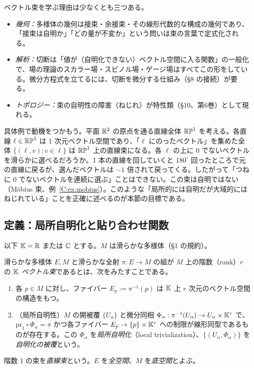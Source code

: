 ベクトル束を学ぶ理由は少なくとも三つある。
\begin{itemize}
\item \emph{幾何：}多様体の幾何は接束・余接束・その線形代数的な構成の幾何であり、「接束は自明か」「どの量が不変か」という問いは束の言葉で定式化される。
\item \emph{解析：}切断は「値が（自明化できない）ベクトル空間に入る関数」の一般化で、場の理論のスカラー場・スピノル場・ゲージ場はすべてこの形をしている。微分方程式を立てるには、切断を微分する仕組み（§8 の接続）が要る。
\item \emph{トポロジー：}束の自明性の障害（ねじれ）が特性類（§10、第6巻）として現れる。
\end{itemize}
具体例で動機をつかもう。平面 $\mathbb R^2$ の原点を通る直線全体 $\mathbb{RP}^1$ を考える。各直線 $\ell\in\mathbb{RP}^1$ は 1 次元ベクトル空間であり、「$\ell$ にのったベクトル」を集めた全体 $\{(\ell,v):v\in\ell\}$ は $\mathbb{RP}^1$ 上の直線束になる。各 $\ell$ の上に 0 でないベクトルを滑らかに選べるだろうか。1 本の直線を回していくと $180^\circ$ 回ったところで元の直線に戻るが、選んだベクトルは $-1$ 倍されて戻ってくる。したがって「つねに 0 でないベクトルを連続に選ぶ」ことはできない。この束は自明ではない（Möbius 束、例~\ref{C:ex:mobius}）。このような「局所的には自明だが大域的にはねじれている」ことを正確に述べるのが本節の目標である。

\subsection{定義：局所自明化と貼り合わせ関数}
以下 $\mathbb K=\mathbb R$ または $\mathbb C$ とする。$M$ は滑らかな多様体（§1 の規約）。

\begin{defn}[ベクトル束]\label{C:def:vb}
滑らかな多様体 $E,M$ と滑らかな全射 $\pi:E\to M$ の組が $M$ 上の階数（rank）$r$ の $\mathbb K$ \emph{ベクトル束}であるとは、次をみたすことである。
\begin{enumerate}
\item 各 $p\in M$ に対し、ファイバー $E_p:=\pi^{-1}(p)$ は $\mathbb K$ 上 $r$ 次元のベクトル空間の構造をもつ。
\item （局所自明性）$M$ の開被覆 $\{U_\alpha\}$ と微分同相 $\Phi_\alpha:\pi^{-1}(U_\alpha)\to U_\alpha\times\mathbb K^r$ で、$\mathrm{pr}_1\circ\Phi_\alpha=\pi$ かつ各ファイバー $E_p\to\{p\}\times\mathbb K^r$ への制限が線形同型であるものが存在する。この $\Phi_\alpha$ を\emph{局所自明化}（local trivialization）、$\{(U_\alpha,\Phi_\alpha)\}$ を\emph{自明化の被覆}という。
\end{enumerate}
階数 1 の束を\emph{直線束}という。$E$ を\emph{全空間}、$M$ を\emph{底空間}とよぶ。
\end{defn}

